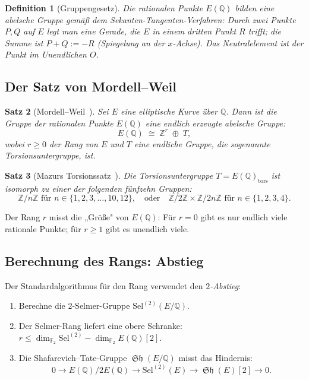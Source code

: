 \documentclass[12pt,a4paper]{article}
\newtheorem{theorem}{Satz}[section]
\newtheorem{definition}[theorem]{Definition}
\theoremstyle{remark}
\DeclareMathOperator{\Sha}{\mathfrak{Sh}}
\begin{document}
\begin{definition}[Gruppengesetz]
  Die rationalen Punkte $E(\mathbb{Q})$ bilden eine abelsche Gruppe gemäß dem
  Sekanten-Tangenten-Verfahren: Durch zwei Punkte $P, Q$ auf $E$ legt man eine Gerade,
  die $E$ in einem dritten Punkt $R$ trifft; die Summe ist $P + Q := -R$ (Spiegelung an
  der $x$-Achse). Das Neutralelement ist der Punkt im Unendlichen $O$.
\end{definition}

\subsection{Der Satz von Mordell--Weil}

\begin{theorem}[Mordell--Weil~\cite{Mordell1922,Weil1928}]
  Sei $E$ eine elliptische Kurve über $\mathbb{Q}$. Dann ist die Gruppe der rationalen
  Punkte $E(\mathbb{Q})$ eine endlich erzeugte abelsche Gruppe:
  \begin{equation}\label{eq:mordellweil}
    E(\mathbb{Q}) \;\cong\; \mathbb{Z}^r \;\oplus\; T,
  \end{equation}
  wobei $r \geq 0$ der \emph{Rang} von $E$ und $T$ eine endliche Gruppe, die sogenannte
  \emph{Torsionsuntergruppe}, ist.
\end{theorem}

\begin{theorem}[Mazurs Torsionssatz~\cite{Mazur1977}]
  Die Torsionsuntergruppe $T = E(\mathbb{Q})_{\mathrm{tors}}$ ist isomorph zu einer
  der folgenden fünfzehn Gruppen:
  \[
    \mathbb{Z}/n\mathbb{Z} \text{ für } n \in \{1,2,3,\ldots,10,12\},
    \quad\text{oder}\quad
    \mathbb{Z}/2\mathbb{Z} \times \mathbb{Z}/2n\mathbb{Z} \text{ für } n \in \{1,2,3,4\}.
  \]
\end{theorem}

Der Rang $r$ misst die „Größe" von $E(\mathbb{Q})$: Für $r = 0$ gibt es nur endlich viele
rationale Punkte; für $r \geq 1$ gibt es unendlich viele.

\subsection{Berechnung des Rangs: Abstieg}

Der Standardalgorithmus für den Rang verwendet den \emph{$2$-Abstieg}:
\begin{enumerate}[nosep]
  \item Berechne die $2$-Selmer-Gruppe $\mathrm{Sel}^{(2)}(E/\mathbb{Q})$.
  \item Der Selmer-Rang liefert eine obere Schranke:
    $r \leq \dim_{\mathbb{F}_2}\mathrm{Sel}^{(2)} - \dim_{\mathbb{F}_2} E(\mathbb{Q})[2]$.
  \item Die Shafarevich--Tate-Gruppe $\Sha(E/\mathbb{Q})$ misst das Hindernis:
  \[
    0 \to E(\mathbb{Q})/2E(\mathbb{Q}) \to \mathrm{Sel}^{(2)}(E) \to \Sha(E)[2] \to 0.
  \]
\end{enumerate}
\end{document}
